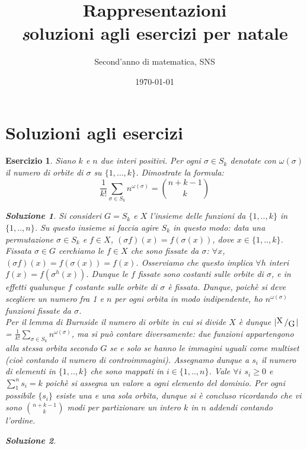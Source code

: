 \documentclass[a4paper]{article}
\title{Rappresentazioni \\ { \textit soluzioni agli esercizi per natale }}
\author{Second'anno di matematica, SNS}
\date{\today}
\theoremstyle{break}
\newtheorem{ex}{{ \Large Esercizio} }
\theoremstyle{plain}
\newtheorem{sol}{Soluzione}[ex]
\begin{document}
\maketitle

\section*{Soluzioni agli esercizi}
\begin{ex} 
Siano $k$ e $n$ due interi positivi. Per ogni $\sigma \in S_k$ denotate con $\omega(\sigma)$ il numero di orbite di $\sigma$ su $\{1, \ldots, k\}$. Dimostrate la formula:
$$ \frac{1}{k!} \sum_{\sigma \in S_k} n^{\omega(\sigma)} = \binom{n+k-1}{k} $$

\begin{sol} 
	Si consideri $G = S_k$ e $X$ l'insieme delle funzioni da $\{1, .., k\}$ in $\{1, .., n\}$. Su questo insieme si faccia agire $S_k$ in questo modo: data una permutazione $\sigma \in S_k$ e $f\in X$, $(\sigma f) (x) = f(\sigma(x))$, dove $x\in \{1, .., k\}$.\\
	Fissata $\sigma \in G$ cerchiamo le $f \in X$ che sono fissate da $\sigma$: $\forall x$, $(\sigma f)(x)=f(\sigma(x))=f(x)$. Osserviamo che questo implica $\forall h$ interi $f(x) = f(\sigma^h (x))$. Dunque le $f$ fissate sono costanti sulle orbite di $\sigma$, e in effetti qualunque $f$ costante sulle orbite di $\sigma$ è fissata. Dunque, poichè si deve scegliere un numero fra 1 e $n$ per ogni orbita in modo indipendente, ho $n^{\omega(\sigma)}$ funzioni fissate da $\sigma$.\\
	Per il lemma di Burnside il numero di orbite in cui si divide $X$ è dunque $|{\raisebox{.2em}{X}\left/\raisebox{-.2em}{G}\right.}|$ = $\frac{1}{k!} \sum_{\sigma \in S_k} n^{\omega(\sigma)}$, ma si può contare diversamente: due funzioni appartengono alla stessa orbita secondo $G$ se e solo se hanno le immagini uguali come multiset (cioè contando il numero di controimmagini). Assegnamo dunque a $s_i$ il numero di elementi in $\{1, .., k\}$ che sono mappati in $i \in \{1, .., n\}$. Vale $\forall i$ $s_i\geq 0$ e $\sum_{1}^{n} s_i = k$ poichè si assegna un valore a ogni elemento del dominio. Per ogni possibile $\{s_i\}$ esiste una e una sola orbita, dunque si è concluso ricordando che vi sono $\binom{n+k-1}{k}$ modi per partizionare un intero $k$ in $n$ addendi contando l'ordine.
\end{sol}

\begin{sol}

\end{sol}


\end{ex}
\end{document}

